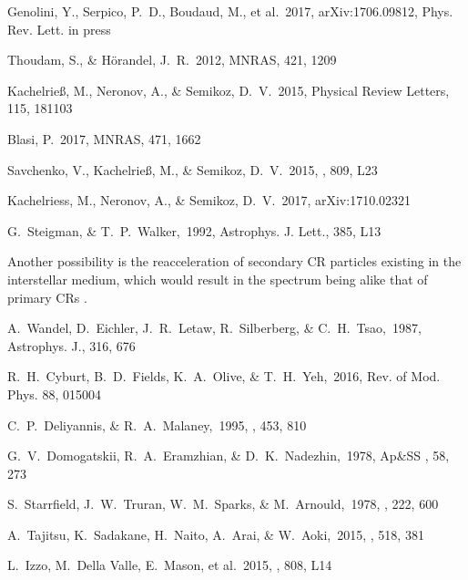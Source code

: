 \documentclass[twocolumn,showpacs,amsmath,amssymb]{revtex4-1}
\begin{document}
\begin{thebibliography}{99}
Genolini, Y., Serpico, P.~D., Boudaud, M., et al.\ 2017, arXiv:1706.09812, Phys. Rev. Lett. in press
  
Thoudam, S., \& H{\"o}randel, J.~R.\ 2012, MNRAS, 421, 1209   

Kachelrie{\ss}, M., Neronov, A., \& Semikoz, D.~V.\ 2015, Physical Review Letters, 115, 181103 

Blasi, P.\ 2017, MNRAS, 471, 1662 

Savchenko, V., Kachelrie{\ss}, M., \& Semikoz, D.~V.\ 2015, \apj, 809, L23
 
Kachelriess, M., Neronov, A., \& Semikoz, D.~V.\ 2017, arXiv:1710.02321  
  
G.~Steigman, \& T.~P.~Walker,\ 1992, Astrophys. J. Lett., 385, L13   

Another possibility is the reacceleration of secondary CR particles existing in the interstellar medium, which would result in the spectrum being alike that of primary CRs \citep{1987ApJ...316..676W}.

A.~Wandel, D.~Eichler, J.~R.~Letaw, R.~Silberberg, \& C.~H.~Tsao,\ 1987, Astrophys. J., 316, 676
  
R.~H.~Cyburt, B.~D.~Fields, K.~A.~Olive, \& T.~H.~Yeh,\ 2016, Rev. of Mod. Phys. 88, 015004 

C.~P.~Deliyannis, \& R.~A.~Malaney,\ 1995, \apj, 453, 810  

G.~V.~Domogatskii, R.~A.~Eramzhian, \& D.~K.~Nadezhin,\ 1978, Ap\&SS , 58, 273 

S.~Starrfield, J.~W.~Truran, W.~M.~Sparks, \& M.~Arnould,\ 1978, \apj, 222, 600   

A.~Tajitsu, K.~Sadakane, H.~Naito, A.~Arai, \& W.~Aoki,\ 2015,
  \nat, 518, 381        
  
L.~Izzo, M.~Della Valle, E.~Mason, et al.\ 2015, \apj, 808, L14     
  

\end{thebibliography}
\end{document}
